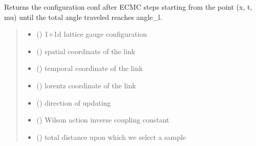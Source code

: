 \documentclass[letterpaper,10pt,english]{sphinxmanual}
\begin{document}
\begin{fulllineitems}
\label{\detokenize{ECMC:ECMC.ECMC_step_l}}
\pysigstartsignatures
\pysiglinewithargsret
{}
{\sphinxparamcomma {}\sphinxparamcomma {}\sphinxparamcomma {}\sphinxparamcomma {}\sphinxparamcomma {}\sphinxparamcomma {}\sphinxparamcomma {}}
{}
\pysigstopsignatures
\sphinxAtStartPar
Returns the configuration conf after ECMC steps starting from the point (x, t, mu) until the total angle traveled reaches angle\_l.
\begin{quote}\begin{description}
\begin{itemize}
\item {} 
\sphinxAtStartPar
{} () \textendash{} 1+1d lattice gauge configuration

\item {} 
\sphinxAtStartPar
{} () \textendash{} spatial coordinate of the link

\item {} 
\sphinxAtStartPar
{} () \textendash{} temporal coordinate of the link

\item {} 
\sphinxAtStartPar
{} () \textendash{} lorentz coordinate of the link

\item {} 
\sphinxAtStartPar
{} () \textendash{} direction of updating

\item {} 
\sphinxAtStartPar
{} () \textendash{} Wilson action inverse coupling constant

\item {} 
\sphinxAtStartPar
{} () \textendash{} total distance upon which we select a sample


\end{itemize}
\end{description}
\end{quote}
\end{fulllineitems}
\end{document}
